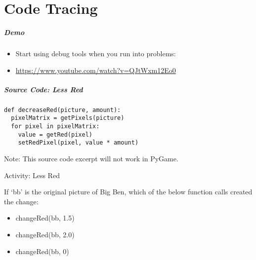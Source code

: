 \part{Code Tracing}
\frame{\partpage}

\begin{frame}
\frametitle{Demo}

\begin{itemize}		
	\item Start using debug tools when you run into problems:
	\item \url{https://www.youtube.com/watch?v=QJtWxm12Eo0}
\end{itemize}

\end{frame}

\begin{frame}[fragile]
	\frametitle{Source Code: Less Red}
	
\begin{lstlisting}
def decreaseRed(picture, amount):
  pixelMatrix = getPixels(picture)
  for pixel in pixelMatrix:
    value = getRed(pixel)
    setRedPixel(pixel, value * amount)
\end{lstlisting}

Note: This source code excerpt will not work in PyGame.

\end{frame}


\begin{frame}{Activity: Less Red}
	\vspace{2em}
	
	If `bb' is the original picture of Big Ben, which of the below function calls created the change:
	
	\begin{itemize}
		\item changeRed(bb, 1.5)
		\item changeRed(bb, 2.0)
		\item changeRed(bb, 0)
	\end{itemize}
\end{frame}
